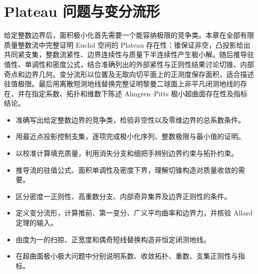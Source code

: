 
% 
% 

\chapter{Plateau 问题与变分流形}
\label{g3:ch:23}

\begin{chapterabstract}
	给定整数边界后，面积极小化首先需要一个能容纳极限的竞争类。本章在全部有限质量整数流中完整证明 Euclid 空间的 Plateau 存在性：锥保证非空，凸投影给出共同紧支集，整数流紧性、边界连续性与质量下半连续性产生极小解。随后推导驻值性、单调性和密度公式，结合准确列出的外部紧性与正则性结果讨论切锥、内部奇点和边界几何。变分流形以位置及无取向切平面上的正测度保存面积，适合描述驻值极限。最后用离散短测地线替换完整证明黎曼二球面上非平凡闭测地线的存在，并在指定系数、拓扑和维数下陈述 Almgren--Pitts 极小超曲面存在性及指标结论。
\end{chapterabstract}

\begin{learninggoals}
	\begin{itemize}
		\item 准确写出给定整数边界的竞争类，检验非空性以及零维边界的总系数条件。
		\item 用最近点投影控制支集，逐项完成极小化序列、整数极限与最小值的证明。
		\item 以校准计算填充质量，利用消失分支和细把手辨别边界约束与拓扑约束。
		\item 推导流的驻值公式、面积单调性及密度下界，理解切锥构造对质量收敛的需要。
		\item 区分密度一正则性、高重数分支、内部奇异集界及边界正则性的条件。
		\item 定义变分流形，计算推前、第一变分、广义平均曲率和边界力，并核验 Allard 定理的输入。
		\item 由度为一的扫掠、正宽度和偶奇短线替换构造非恒定闭测地线。
		\item 在超曲面极小极大问题中分别说明系数、收敛拓扑、重数、支集正则性与指标。
	\end{itemize}
\end{learninggoals}

